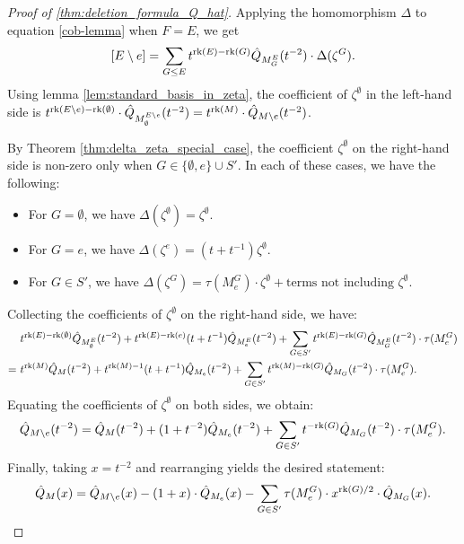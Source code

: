 \documentclass[10pt]{article}
\newcommand{\rank}{\normalfont\text{rk}}
\theoremstyle{remark}
\begin{document}
\begin{proof}[Proof of \ref{thm:deletion_formula_Q_hat}]
    Applying the homomorphism $\Delta$ to equation \ref{cob-lemma}
    when $F = E$, we get 
    \[[E\setminus e] = \sum_{G \leq E} t^{\rank(E) - \rank(G)} \hat{Q}_{M_G^E}(t^{-2}) \cdot \Delta(\zeta^G).\] 
    Using lemma \ref{lem:standard_basis_in_zeta}, the coefficient of $\zeta^\emptyset$ in the left-hand side is
    $t^{\rank(E\setminus e) - \rank(\emptyset)}\cdot
    \hat{Q}_{M_\emptyset^{E\setminus e}}(t^{-2}) = t^{\rank(M)}\cdot
    \hat{Q}_{M\setminus e}(t^{-2})$.
    
    By Theorem \ref{thm:delta_zeta_special_case}, the coefficient $\zeta^\emptyset$ on the right-hand side is non-zero only when $G\in \{\emptyset, e\} \cup S'$. In each of these cases, we have the following:
    \begin{itemize}
        \item For $G = \emptyset$, we have $\Delta(\zeta^\emptyset) = \zeta^\emptyset$.
        \item For $G = e$, we have $\Delta(\zeta^e) = (t+t^{-1})\zeta^\emptyset$.
        \item For $G\in S'$, we have $\Delta(\zeta^G) = \tau(M^G_e)\cdot\zeta^\emptyset
            +\text{terms not including $\zeta^\emptyset$}$.
    \end{itemize}
    
    Collecting the coefficients of
    $\zeta^\emptyset$ on the right-hand side, we have:
    \begin{align*}
        &t^{\rank(E) - \rank(\emptyset)}
        \hat{Q}_{M_\emptyset^E}(t^{-2}) + t^{\rank(E) - \rank(e)}(t+t^{-1})
        \hat{Q}_{M_e^E}(t^{-2}) + \sum_{G\in S'} t^{\rank(E) - \rank(G)}
        \hat{Q}_{M_G^E}(t^{-2})\cdot \tau(M^G_e)\\
        =\ &t^{\rank(M)}
        \hat{Q}_{M}(t^{-2}) + t^{\rank(M) - 1}(t+t^{-1})
        \hat{Q}_{M_e}(t^{-2}) + \sum_{G\in S'} t^{\rank(M) - \rank(G)}
        \hat{Q}_{M_G}(t^{-2})\cdot \tau(M^G_e).
    \end{align*}
    Equating the coefficients of $\zeta^\emptyset$ on both sides, we obtain:
    \[\hat{Q}_{M\setminus e}(t^{-2}) = \hat{Q}_{M}(t^{-2}) + (1+t^{-2})
    \hat{Q}_{M_e}(t^{-2}) + \sum_{G\in S'} t^{- \rank(G)}
    \hat{Q}_{M_G}(t^{-2})\cdot \tau(M^G_e).\]
    Finally, taking $x = t^{-2}$ and rearranging yields the desired statement: \[
    \hat{Q}_M(x) = \hat{Q}_{M\setminus e}(x) -(1 + x)\cdot \hat{Q}_{M_e}(x) -
    \sum_{G \in S'}{\tau(M^G_e)\cdot x^{\rank(G)/2}\cdot
    \hat{Q}_{M_G}(x)}.
\]
\end{proof}
\end{document}
